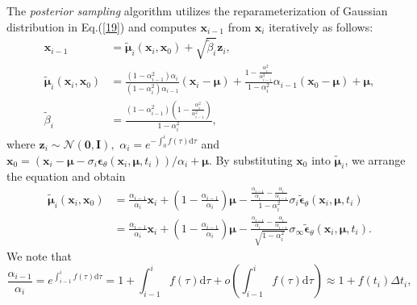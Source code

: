 The \textit{posterior sampling} \citep{luo2024posterior} algorithm utilizes the reparameterization of Gaussian distribution in Eq.(\ref{19}) and computes $\boldsymbol{x}_{i-1}$ from $\boldsymbol{x}_{i}$ iteratively as follows:
\begin{equation}
\begin{aligned}
    \boldsymbol{x}_{i-1}&=\tilde{\boldsymbol\mu}_{i}(\boldsymbol{x}_{i},\boldsymbol{x}_0)+\sqrt{\tilde{\beta}_{i}}\boldsymbol{z}_i,\\
    \tilde{\boldsymbol\mu}_{i}(\boldsymbol{x}_{i},\boldsymbol{x}_{0})&=\frac{(1-\alpha^2_{i-1})\alpha_{i}}{(1-\alpha^2_{i})\alpha_{i-1}}(\boldsymbol{x}_{i}-\boldsymbol\mu)+\frac{1-\frac{\alpha^2_{i}}{\alpha^2_{i-1}}}{1-\alpha^2_{i}}\alpha_{i-1}(\boldsymbol{x}_{0}-\boldsymbol\mu)+\boldsymbol\mu,\\
    \tilde{\beta}_{i}&=\frac{(1-\alpha^2_{i-1})(1-\frac{\alpha^2_{i}}{\alpha^2_{i-1}})}{1-\alpha^2_{i}},
    \label{a2-1}
\end{aligned}
\end{equation}
where $\boldsymbol{z}_i\sim\mathcal{N}(\boldsymbol{0},\boldsymbol{I}),$ $\alpha_{i}=e^{-\int_{0}^{i}f(\tau)\mathrm{d}\tau}$ and $\boldsymbol{x}_0=\left(\boldsymbol{x}_{i}-\boldsymbol\mu-\sigma_{i}{\boldsymbol\epsilon}_\theta(\boldsymbol{x}_{i},\boldsymbol\mu,t_i)\right)/\alpha_{i}+\boldsymbol\mu$. By substituting $\boldsymbol{x}_0$ into $\tilde{\boldsymbol\mu}_{i}$, we arrange the equation and obtain
\begin{equation}
\begin{aligned}
\tilde{\boldsymbol\mu}_{i}(\boldsymbol{x}_{i},\boldsymbol{x}_0)&=\frac{\alpha_{i-1}}{\alpha_{i}}\boldsymbol{x}_{i}+(1-\frac{\alpha_{i-1}}{\alpha_{i}})\boldsymbol{\mu}-\frac{\frac{\alpha_{i-1}}{\alpha_{i}}-\frac{\alpha_{i}}{\alpha_{i-1}}}{1-\alpha^2_{i}}\sigma_{i}\tilde{\boldsymbol\epsilon}_\theta(\boldsymbol{x}_{i},\boldsymbol\mu,t_i)\\
&=\frac{\alpha_{i-1}}{\alpha_{i}}\boldsymbol{x}_{i}+(1-\frac{\alpha_{i-1}}{\alpha_{i}})\boldsymbol{\mu}-\frac{\frac{\alpha_{i-1}}{\alpha_{i}}-\frac{\alpha_{i}}{\alpha_{i-1}}}{\sqrt{1-\alpha^2_{i}}}\sigma_\infty\tilde{\boldsymbol\epsilon}_\theta(\boldsymbol{x}_{i},\boldsymbol\mu,t_i).
\label{a2-2}
\end{aligned}
\end{equation}
We note that
\begin{equation}
\frac{\alpha_{i-1}}{\alpha_{i}}=e^{\int_{i-1}^{i}f(\tau)\mathrm{d}\tau}=1+\int_{i-1}^{i}f(\tau)\mathrm{d}\tau+o\left(\int_{i-1}^{i}f(\tau)\mathrm{d}\tau\right)
\approx1+f(t_{i})\Delta t_i,
\label{a2-3}
\end{equation}
